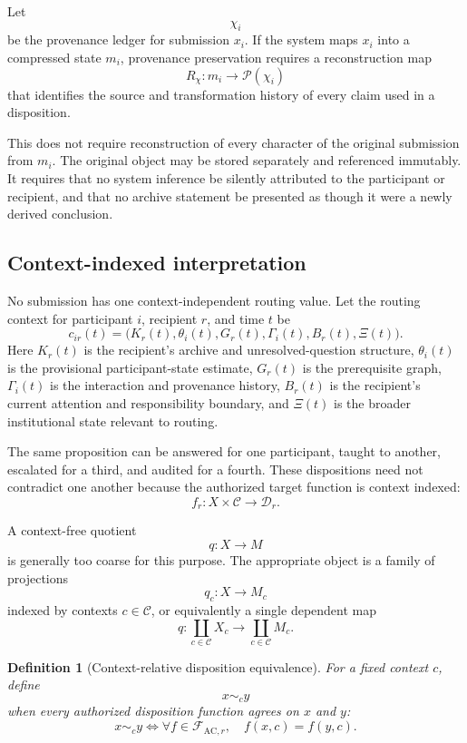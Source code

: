 \documentclass[11pt]{article}
\newtheorem{definition}{Definition}[section]
\theoremstyle{definition}
\newcommand{\F}{\mathcal{F}}
\newcommand{\D}{\mathcal{D}}
\begin{document}
Let
\[
\chi_i
\]
be the provenance ledger for submission \(x_i\). If the system maps \(x_i\) into a compressed state \(m_i\), provenance preservation requires a reconstruction map
\[
R_{\chi}:m_i\longrightarrow \mathcal{P}(\chi_i)
\]
that identifies the source and transformation history of every claim used in a disposition.

This does not require reconstruction of every character of the original submission from \(m_i\). The original object may be stored separately and referenced immutably. It requires that no system inference be silently attributed to the participant or recipient, and that no archive statement be presented as though it were a newly derived conclusion.

\subsection{Context-indexed interpretation}

No submission has one context-independent routing value. Let the routing context for participant \(i\), recipient \(r\), and time \(t\) be
\[
c_{ir}(t)
=
\bigl(
K_r(t),
\theta_i(t),
G_r(t),
\Gamma_i(t),
B_r(t),
\Xi(t)
\bigr).
\]
Here \(K_r(t)\) is the recipient's archive and unresolved-question structure, \(\theta_i(t)\) is the provisional participant-state estimate, \(G_r(t)\) is the prerequisite graph, \(\Gamma_i(t)\) is the interaction and provenance history, \(B_r(t)\) is the recipient's current attention and responsibility boundary, and \(\Xi(t)\) is the broader institutional state relevant to routing.

The same proposition can be answered for one participant, taught to another, escalated for a third, and audited for a fourth. These dispositions need not contradict one another because the authorized target function is context indexed:
\[
f_r:X\times\mathcal{C}\longrightarrow\D_r.
\]

A context-free quotient
\[
q:X\longrightarrow M
\]
is generally too coarse for this purpose. The appropriate object is a family of projections
\[
q_c:X\longrightarrow M_c
\]
indexed by contexts \(c\in\mathcal{C}\), or equivalently a single dependent map
\[
q:
\coprod_{c\in\mathcal C}X_c
\longrightarrow
\coprod_{c\in\mathcal C}M_c.
\]

\begin{definition}[Context-relative disposition equivalence]
For a fixed context \(c\), define
\[
x\sim_c y
\]
when every authorized disposition function agrees on \(x\) and \(y\):
\[
x\sim_c y
\iff
\forall f\in\F_{\mathrm{AC},r},
\quad
f(x,c)=f(y,c).
\]
\end{definition}
\end{document}
